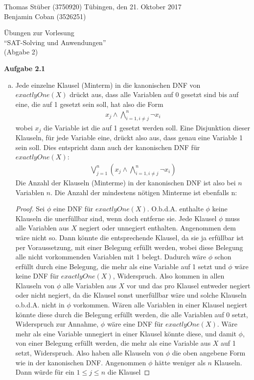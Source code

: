 \documentclass[a4paper,10pt]{article}
\title{}
\author{}
\begin{document}
\noindent Thomas Stüber (3750920) \hfill Tübingen, den  21. Oktober 2017\\
\noindent Benjamin Coban (3526251) \\
\begin{center}
\Large Übungen zur Vorlesung  \\ ``SAT-Solving und Anwendungen'' \\
\vspace*{2mm}
\large (Abgabe 2) \\
\vspace*{2mm}
\end{center}

\noindent\textbf{Aufgabe 2.1}\\
\begin{enumerate}[a)]
\item Jede einzelne Klausel (Minterm) in die kanonischen DNF von $exactlyOne(X)$ drückt aus, dass alle Variablen auf 0 gesetzt sind bis auf eine, die auf 1 gesetzt sein soll, hat also die Form 
\begin{align*}
x_j \wedge \bigwedge_{i=1, i \neq j}^n \neg x_i 
\end{align*}
wobei $x_j$ die Variable ist die auf 1 gesetzt werden soll. Eine Disjunktion dieser Klauseln, für jede Variable eine, drückt also aus, dass genau eine Variable 1 sein soll. Dies entspricht dann auch der kanonischen DNF für $exactlyOne(X)$:
\begin{align*}
\bigvee_{j=1}^n \left( x_j \wedge \bigwedge_{i=1, i \neq j}^n \neg x_i \right)
\end{align*}
Die Anzahl der Klauseln (Minterme) in der kanonischen DNF ist also bei $n$ Variablen $n$. Die Anzahl der mindestens nötigen Minterme ist ebenfalls n:
\begin{proof}
Sei $\phi$ eine DNF für $exactlyOne(X)$. O.b.d.A. enthalte $\phi$ keine Klauseln die unerfüllbar sind, wenn doch entferne sie. Jede Klausel $\phi$ muss alle Variablen aus $X$ negiert oder unnegiert enthalten. Angenommen dem wäre nicht so. Dann könnte die entsprechende Klausel, da sie ja erfüllbar ist per Voraussetzung, mit einer Belegung erfüllt werden, wobei diese Belegung alle nicht vorkommenden Variablen mit 1 belegt. Dadurch wäre $\phi$ schon erfüllt durch eine Belegung, die mehr als eine Variable auf 1 setzt und $\phi$ wäre keine DNF für $exactlyOne(X)$, Widerspruch. Also kommen in allen Klauseln von $\phi$ alle Variablen aus $X$ vor und das pro Klausel entweder negiert oder nicht negiert, da die Klausel sonst unerfüllbar wäre und solche Klauseln o.b.d.A. nicht in $\phi$ vorkommen. Wären alle Variablen in einer Klausel negiert könnte diese durch die Belegung erfüllt werden, die alle Variablen auf 0 setzt, Widerspruch zur Annahme, $\phi$ wäre eine DNF für $exactlyOne(X)$. Wäre mehr als eine Variable unnegiert in einer Klausel könnte diese, und damit $\phi$, von einer Belegung erfüllt werden, die mehr als eine Variable aus $X$ auf 1 setzt, Widerspruch. Also haben alle Klauseln von $\phi$ die oben angebene Form wie in der kanonischen DNF. Angenommen $\phi$ hätte weniger als $n$ Klauseln. Dann würde für ein $1 \leq j \leq n$ die Klausel 

\end{proof}
\end{enumerate}
\end{document}
